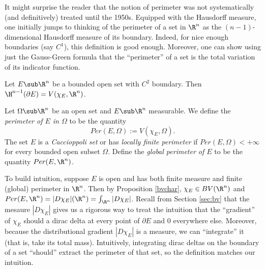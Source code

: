 \documentclass[../main.tex]{subfiles}
\begin{document}
It might surprise the reader that the notion of perimeter was not systematically (and definitively) treated until the 1950s. 
Equipped with the Hausdorff measure, one initially jumps to thinking of the perimeter of a set in $ \R^{n} $ as the $ (n-1) $-dimensional Hausdorff measure of its boundary. Indeed, for nice enough boundaries (say $ C^1 $), this definition is good enough. Moreover,  one can show using just the Gauss-Green formula that the ``perimeter'' of a set is the total variation of its indicator function.
\begin{factexercise}
    Let $ E\sub \R^{n} $ be a bounded open set with $ C^{2} $ boundary. Then $ \H^{n-1}(\partial E) = V(\chi_{E},\R^{n}) $.
\end{factexercise}



\begin{definition}
    Let $ \Omega\sub \R^{n} $ be an open set and $ E\sub \R^{n} $ measurable. We define the \textit{perimeter of $ E $ in $ \Omega $} to be the quantity
    \[
        Per(E,\Omega):= V( \chi_{E}, \Omega).
    \]
    The set $ E $ is a \textit{Caccioppoli set} or has \textit{locally finite perimeter} if $ Per(E,\Omega) <+\infty $ for every bounded open subset $ \Omega $. Define the \textit{global perimeter of $ E $} to be the quantity $ Per(E,\R^{n}) $.
\end{definition}


To build intuition, suppose $ E $ is open and has both finite measure and finite (global) perimeter in $ \R^{n} $. Then by Proposition \ref{bvchar}, $ \chi_{E}\in BV(\R^{n}) $ and $ Per(E,\R^{n}) = |D \chi_{E}|(\R^{n}) = \int_{\R^{n}}|D \chi_{E}|$. Recall from Section \ref{sec:bv} that the mesaure $ |D \chi_{E}| $ gives us a rigorous way to treat the intuition that the ``gradient'' of $ \chi_{E} $ should a dirac delta at every point of $ \partial E $ and $ 0 $ everywhere else. Moreover, because the distributional gradient $ |D \chi_{E}| $ is a measure, we can ``integrate'' it (that is, take its total mass). Intuitively, integrating dirac deltas on the boundary of a set ``should'' extract the perimeter of that set, so the definition matches our intuition.
\end{document}
